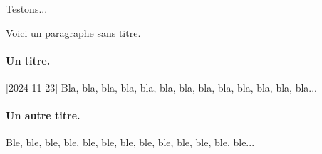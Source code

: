 Testons...

Voici un paragraphe sans titre.

\paragraph{Un titre.}
[2024-11-23]
Bla, bla, bla, bla, bla, bla, bla, bla, bla, bla, bla, bla, bla...

\paragraph{Un autre titre.}
Ble, ble, ble, ble, ble, ble, ble, ble, ble, ble, ble, ble, ble...
